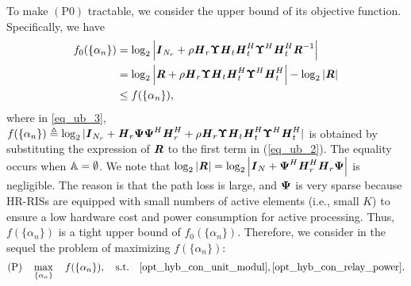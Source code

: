 \documentclass[conference]{IEEEtran}
\begin{document}
	
	To make $(\mathrm{P0})$ tractable, we consider the upper bound of its objective function. Specifically, we have
	\begin{align}
	f_0(\{\alpha_n\})
	&=  \log_2 \left| \textbf{\textit{I}}_{N_r} + \rho \textbf{\textit{H}}_r \boldsymbol{\Upsilon} \textbf{\textit{H}}_t \textbf{\textit{H}}_t^H \boldsymbol{\Upsilon}^H \textbf{\textit{H}}_t^H \textbf{\textit{R}}^{-1}\right|  \label{eq_ub_1} \\
	&= \log_2 \left| \textbf{\textit{R}} + \rho \textbf{\textit{H}}_r \boldsymbol{\Upsilon} \textbf{\textit{H}}_t \textbf{\textit{H}}_t^H \boldsymbol{\Upsilon}^H \textbf{\textit{H}}_t^H \right| - \log_2 \left|\textbf{\textit{R}}\right|  \label{eq_ub_2} \\
	&\leq f(\{\alpha_n\})  \label{eq_ub_3},
	\end{align}
	where in \eqref{eq_ub_3}, $f(\{\alpha_n\}) \triangleq \log_2 |\textbf{\textit{I}}_{N_r} + \textbf{\textit{H}}_r \boldsymbol{\Psi} \boldsymbol{\Psi}^H \textbf{\textit{H}}_r^H  + \rho \textbf{\textit{H}}_r \boldsymbol{\Upsilon} \textbf{\textit{H}}_t \textbf{\textit{H}}_t^H \boldsymbol{\Upsilon}^H \textbf{\textit{H}}_t^H|$ is obtained by substituting the expression of $\textbf{\textit{R}}$ to the first term in (\ref{eq_ub_2}). The equality occurs when $\mathbb{A} = \emptyset$. We note that $\log_2 \left|\textbf{\textit{R}}\right| = \log_2 \left|\textbf{\textit{I}}_{N} + \boldsymbol{\Psi}^H \textbf{\textit{H}}_r^H \textbf{\textit{H}}_r \boldsymbol{\Psi} \right|$ is negligible. The reason is that the path loss is large, and $\boldsymbol{\Psi}$ is very sparse because HR-RISs are equipped with small numbers of active elements (i.e., small $K$) to ensure a low hardware cost and power consumption for active processing. Thus, $f(\{\alpha_n\})$ is a tight upper bound of $f_0(\{\alpha_n\})$. Therefore, we consider in the sequel the problem of maximizing $f(\{\alpha_n\})$:
	\begin{align*}
	\left(\mathrm{P} \right) \quad \max_{\{\alpha_n\}} \quad  f(\{\alpha_n\}), \quad
	\textrm{s.t.} \quad \eqref{opt_hyb_con_unit_modul}, \eqref{opt_hyb_con_relay_power}.
	\end{align*}
	
	
\end{document}
